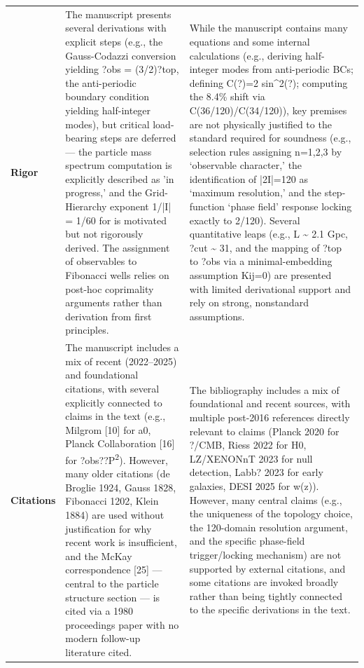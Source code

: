 \documentclass[11pt]{article}
\begin{document}
\begin{longtable}{@{} p{2.2cm} p{6.3cm} p{6.3cm} @{}}
\rowcolor{rowgray}
\textbf{Rigor} &
The manuscript presents several derivations with explicit steps (e.g., the Gauss-Codazzi conversion yielding ?obs = (3/2)?top, the anti-periodic boundary condition yielding half-integer modes), but critical load-bearing steps are deferred --- the particle mass spectrum computation is explicitly described as 'in progress,' and the Grid-Hierarchy exponent 1/|I| = 1/60 for \textalpha{} is motivated but not rigorously derived. The assignment of observables to Fibonacci wells relies on post-hoc coprimality arguments rather than derivation from first principles. &
While the manuscript contains many equations and some internal calculations (e.g., deriving half-integer modes from anti-periodic BCs; defining C(?)=2 sin\textasciicircum{}2(\textpi{}?); computing the 8.4\% shift via C(36/120)/C(34/120)), key premises are not physically justified to the standard required for soundness (e.g., selection rules assigning n=1,2,3 by `observable character,' the identification of |2I|=120 as `maximum resolution,' and the step-function `phase field' response locking exactly to 2/120). Several quantitative leaps (e.g., L \textasciitilde{} 2.1 Gpc, ?cut \textasciitilde{} 31, and the mapping of ?top to ?obs via a minimal-embedding assumption Kij=0) are presented with limited derivational support and rely on strong, nonstandard assumptions. \\[6pt]

\textbf{Citations} &
The manuscript includes a mix of recent (2022--2025) and foundational citations, with several explicitly connected to claims in the text (e.g., Milgrom [10] for a0, Planck Collaboration [16] for ?obs??P\textsuperscript{2}). However, many older citations (de Broglie 1924, Gauss 1828, Fibonacci 1202, Klein 1884) are used without justification for why recent work is insufficient, and the McKay correspondence [25] --- central to the particle structure section --- is cited via a 1980 proceedings paper with no modern follow-up literature cited. &
The bibliography includes a mix of foundational and recent sources, with multiple post-2016 references directly relevant to claims (Planck 2020 for ?/CMB, Riess 2022 for H0, LZ/XENONnT 2023 for null detection, Labb? 2023 for early galaxies, DESI 2025 for w(z)). However, many central claims (e.g., the uniqueness of the topology choice, the 120-domain resolution argument, and the specific phase-field trigger/locking mechanism) are not supported by external citations, and some citations are invoked broadly rather than being tightly connected to the specific derivations in the text. \\

\end{longtable}
\end{document}
